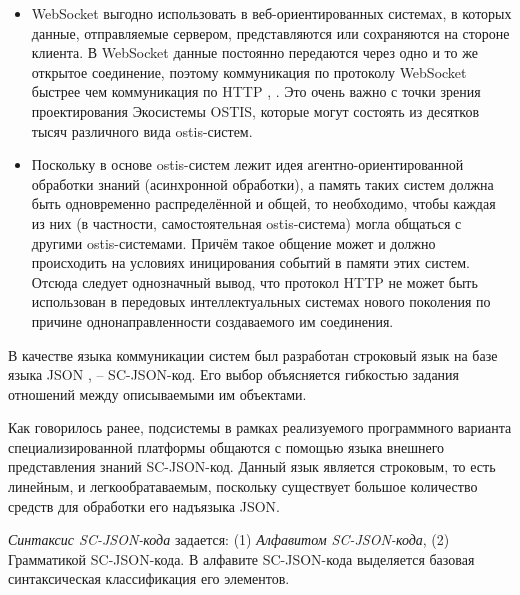 \begin{itemize}
    \item WebSocket выгодно использовать в веб-ориентированных системах, в которых данные, отправляемые сервером, представляются или сохраняются на стороне клиента. В WebSocket данные постоянно передаются через одно и то же открытое соединение, поэтому коммуникация по протоколу WebSocket быстрее чем коммуникация по HTTP \cite{tomasetti2021analysis}, \cite{webockets_overview}. Это очень важно с точки зрения проектирования Экосистемы OSTIS, которые могут состоять из десятков тысяч различного вида ostis-систем.
    \item Поскольку в основе ostis-систем лежит идея агентно-ориентированной обработки знаний (асинхронной обработки), а память таких систем должна быть одновременно распределённой и общей, то необходимо, чтобы каждая из них (в частности, самостоятельная ostis-система) могла общаться с другими ostis-системами. Причём такое общение может и должно происходить на условиях иницирования событий в памяти этих систем. Отсюда следует однозначный вывод, что протокол HTTP не может быть использован в передовых интеллектуальных системах нового поколения по причине однонаправленности создаваемого им соединения.
\end{itemize}
В качестве языка коммуникации систем был разработан строковый язык на базе языка JSON \cite{pezoa2016foundations}, \cite{marrs2017json} -- SC-JSON-код. Его выбор объясняется гибкостью задания отношений между описываемыми им объектами.

Как говорилось ранее, подсистемы в рамках реализуемого программного варианта специализированной платформы общаются с помощью языка внешнего представления знаний SC-JSON-код. Данный язык является строковым, то есть линейным, и легкообратаваемым, поскольку существует большое количество средств для обработки его надъязыка JSON.

\begin{SCn}
\begin{scnindent}
\end{scnindent}
\end{SCn}

\textit{Синтаксис SC-JSON-кода} задается: (1) \textit{Алфавитом SC-JSON-кода}, (2) Грамматикой SC-JSON-кода. В алфавите SC-JSON-кода выделяется базовая синтаксическая классификация его элементов.

